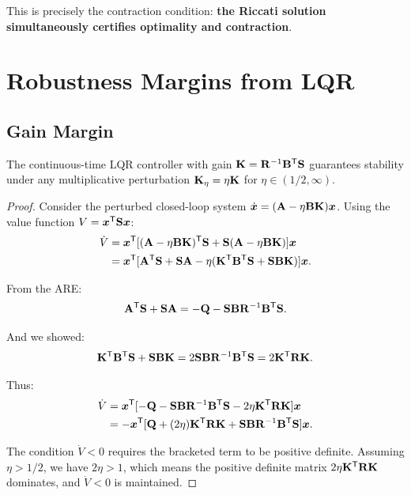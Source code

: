 This is precisely the contraction condition: \textbf{the Riccati solution simultaneously certifies optimality and contraction}.

\section{Robustness Margins from LQR}

\subsection{Gain Margin}

\begin{theorem}
\label{thm:ch6:gain-margin}
The continuous-time LQR controller with gain $\mathbf{K} = \mathbf{R}^{-1}\mathbf{B}^{\mathsf{T}}\mathbf{S}$ guarantees stability
under any multiplicative perturbation $\mathbf{K}_\eta = \eta\mathbf{K}$ for $\eta \in (1/2, \infty)$.
\end{theorem}

\begin{proof}
Consider the perturbed closed-loop system $\dot{\bm{x}} = (\mathbf{A} - \eta\mathbf{B}\mathbf{K})\bm{x}$. Using the value function
$V = \bm{x}^{\mathsf{T}}\mathbf{S}\bm{x}$:
\begin{align}
\dot{V} &= \bm{x}^{\mathsf{T}}[(\mathbf{A} - \eta\mathbf{B}\mathbf{K})^{\mathsf{T}}\mathbf{S} + \mathbf{S}(\mathbf{A} - \eta\mathbf{B}\mathbf{K})]\bm{x} \notag\\
&= \bm{x}^{\mathsf{T}}[\mathbf{A}^{\mathsf{T}}\mathbf{S} + \mathbf{S}\mathbf{A} - \eta(\mathbf{K}^{\mathsf{T}}\mathbf{B}^{\mathsf{T}}\mathbf{S} + \mathbf{S}\mathbf{B}\mathbf{K})]\bm{x}.
\label{eq:ch6:eta-V-dot}
\end{align}

From the ARE:
\begin{equation}
\mathbf{A}^{\mathsf{T}}\mathbf{S} + \mathbf{S}\mathbf{A} = -\mathbf{Q} - \mathbf{S}\mathbf{B}\mathbf{R}^{-1}\mathbf{B}^{\mathsf{T}}\mathbf{S}.
\label{eq:ch6:are-form}
\end{equation}

And we showed:
\begin{equation}
\mathbf{K}^{\mathsf{T}}\mathbf{B}^{\mathsf{T}}\mathbf{S} + \mathbf{S}\mathbf{B}\mathbf{K} = 2\mathbf{S}\mathbf{B}\mathbf{R}^{-1}\mathbf{B}^{\mathsf{T}}\mathbf{S} = 2\mathbf{K}^{\mathsf{T}}\mathbf{R}\mathbf{K}.
\label{eq:ch6:control-term}
\end{equation}

Thus:
\begin{align}
\dot{V} &= \bm{x}^{\mathsf{T}}[-\mathbf{Q} - \mathbf{S}\mathbf{B}\mathbf{R}^{-1}\mathbf{B}^{\mathsf{T}}\mathbf{S} - 2\eta\mathbf{K}^{\mathsf{T}}\mathbf{R}\mathbf{K}]\bm{x} \notag\\
&= -\bm{x}^{\mathsf{T}}[\mathbf{Q} + (2\eta)\mathbf{K}^{\mathsf{T}}\mathbf{R}\mathbf{K} + \mathbf{S}\mathbf{B}\mathbf{R}^{-1}\mathbf{B}^{\mathsf{T}}\mathbf{S}]\bm{x}.
\label{eq:ch6:eta-perturbed-V}
\end{align}

The condition $\dot{V} < 0$ requires the bracketed term to be positive definite. Assuming $\eta > 1/2$, we have
$2\eta > 1$, which means the positive definite matrix $2\eta\mathbf{K}^{\mathsf{T}}\mathbf{R}\mathbf{K}$ dominates, and $\dot{V} < 0$ is maintained.
\end{proof}

